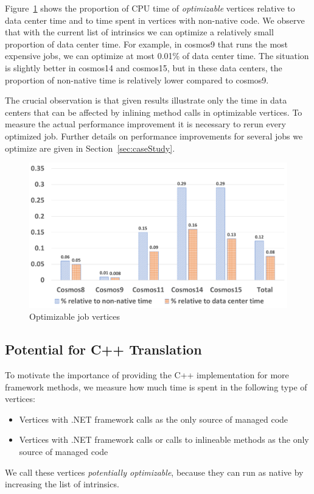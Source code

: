 Figure~\ref{fig:optimizable} shows the proportion of CPU time of \emph{optimizable} vertices relative to data center time and to time spent in vertices with non-native code. 
We observe that with the current list of intrinsics we can optimize a relatively small proportion of data center time. 
For example, in cosmos9 that runs the most expensive jobs, we can optimize at most 0.01\% of data center time. 
The situation is slightly better in cosmos14 and cosmos15, but in these data centers, the proportion of non-native time is relatively lower compared to cosmos9.

The crucial observation is that given results illustrate only the time in data centers that can be affected by inlining method calls in optimizable vertices. 
To measure the actual performance improvement it is necessary to rerun every optimized job. 
Further details on performance improvements for several jobs we optimize are given in Section~\ref{sec:caseStudy}.

\begin{figure}[ht]
\includegraphics[scale=0.8]{graphs/optimizable}
\caption{Optimizable job vertices}
\label{fig:optimizable}
\end{figure}

\subsection{Potential for C++ Translation}
To motivate the importance of providing the C++ implementation for more framework methods, we measure how much time is spent in the following type of vertices:
\begin{itemize}
\item Vertices with .NET framework calls as the only source of managed code
\item Vertices with .NET framework calls or calls to inlineable methods as the only source of managed code
\end{itemize}
We call these vertices \emph{potentially optimizable}, because they can run as native by increasing the list of intrinsics.

